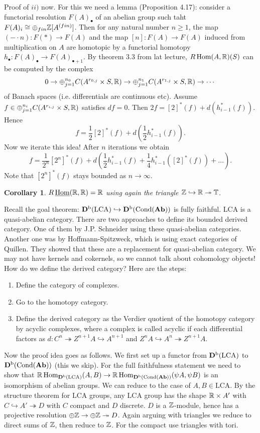\documentclass[A4paper, british]{amsart}
\theoremstyle{darkgreentheorem}
\newtheorem{cor}[thm]{Corollary}
\theoremstyle{darkbluedefinition}
\theoremstyle{darkredexample}
\theoremstyle{remark}
\DeclareMathOperator{\Hom}{Hom}
\DeclareMathOperator{\Cond}{Cond}
\DeclareMathOperator{\ihom}{\underline{Hom}}
\newcommand{\1}{\mathbbm{1}}
\newcommand{\op}{\oplus}
\newcommand{\tms}{\times}
\newcommand{\epi}{\twoheadrightarrow}
\newcommand{\mono}{\hookrightarrow}
\newcommand{\LCA}{\mathrm{LCA}}
\begin{document}
Proof of $ii)$ now.
For this we need a lemma (Proposition 4.17): consider a functorial resolution $F(A)_{\bullet}$ of an abelian group such taht $F(A)_{i}\cong \op_{fin}\Z[A^{(fin)}]$.
Then for any natural number $n\geqslant 1$, the map $(-\cdot n)\colon F(*)\to F(A)$ and the map $[n]\colon F(A)\to F(A)$ induced from multiplication on $A$ are homotopic by a functorial homotopy $h_{\bullet}\colon F(A)_{\bullet}\to F(A)_{\bullet +1}$.
By theorem 3.3 from lat lecture, $R\Hom(A,\R)(S)$ can be computed by the complex
\[ 0\to \op_{j=1}^{n_{0}}C(A^{r_{0,j}}\tms S,\R)\to \op_{j=1}^{n_{1}}C(A^{r_{1,j}}\tms S,\R)\to \cdots \]
of Banach spaces (i.e. differentials are continuous etc).
Assume $f\in \op_{j=1}^{n_{i}}C(A^{r_{i,j}}\tms S,\R)$ satisfies $df=0$.
Then $2f=[2]^{*}(f)+d(h_{i-1}^{*}(f))$.
Hence
\[ f=\frac{1}{2}[2]^{*}(f)+d(\frac{1}{2}h_{i-1}^{*}(f)).\]
Now we iterate this idea!
After $n$ iterations we obtain
\[ f=\frac{1}{2^{n}}[2^{n}]^{*}(f)+d(\frac{1}{2}h_{i-1}^{*}(f)+\frac{1}{4}h_{i-1}^{*}([2]^{*}(f))+\ldots ). \]
Note that $[2^{n}]^{*}(f)$ stays bounded as $n\to \infty$.

\begin{cor}
    $R\ihom(\R,\R)=\R$ using again the triangle $\Z\mono\R\epi\bbT$.
\end{cor}

Recall the goal theorem: $\Db(\LCA)\mono \Db(\Cond(\Ab))$ is fully faithful.
$\LCA$ is a quasi-abelian category.
There are two approaches to define its bounded derived category.
One of them by J.P. Schneider using these quasi-abelian categories.
Another one was by Hoffmann-Spitzweck, which is using exact categories of Quillen.
They showed that these are a replacement for quasi-abelian category.
We may not have kernels and cokernels, so we cannot talk about cohomology objects!
How do we define the derived category?
Here are the steps:

\begin{enumerate}
    \item Define the category of complexes.
    \item Go to the homotopy category.
    \item Define the derived category as the Verdier quotient of the homotopy category by acyclic complexes, where a complex is called acyclic if each differential factors as $d\colon C^{n}\epi Z^{n+1}A\mono A^{n+1}$ and $Z^{n}A\mono A^{n}\epi Z^{n+1}A$.
\end{enumerate}

Now the proof idea goes as follows.
We first set up a functor from $\Db(\LCA)$ to $\Db(\Cond(\Ab))$ (this we skip).
For the full faithfulness statement we need to show that $\R\Hom_{\Db(\LCA)}(A,B)\to \R\Hom_{\Db(\Cond(\Ab))}(\psi A,\psi B)$ is an isomorphism of abelian groups.
We can reduce to the case of $A,B\in \LCA$.
By the structure theorem for $\LCA$ groups, any $\LCA$ group has the shape $\R\tms A'$ with $C\mono A'\epi D$ with $C$ compact and $D$ discrete.
$D$ is a $\mathbb{Z}$-module, hence has a projective resolution $\op \Z\to \op \Z\epi D$.
Again arguing with triangles we reduce to direct sums of $\mathbb{Z}$, then reduce to $\mathbb{Z}$.
For the compact use triangles with tori.
\end{document}
